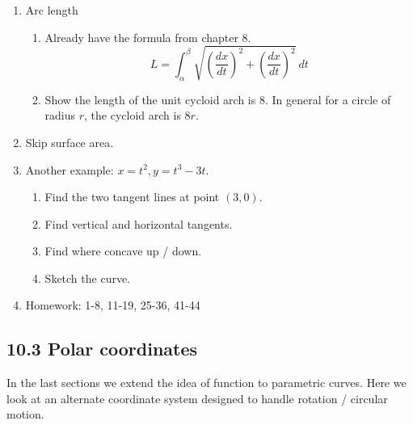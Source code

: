 \documentclass{article}
\begin{document}
\begin{enumerate}
\item Arc length
\begin{enumerate}
\item Already have the formula from chapter 8.
\[
L = \int_{\alpha}^{\beta} \sqrt{\left( \frac{dx}{dt}\right)^2 + \left( \frac{dx}{dt} \right)^2 }~dt
\]
\item Show the length of the unit cycloid arch is 8. In general for a circle of radius $r$, the cycloid arch is $8r$. 
\end{enumerate}


\item Skip surface area.

\item Another example: $x=t^2, y=t^3-3t$. 
\begin{enumerate}
\item Find the two tangent lines at point $(3,0)$. 
\item Find vertical and horizontal tangents.
\item Find where concave up / down.
\item Sketch the curve. 
\end{enumerate}


\item Homework: 1-8, 11-19, 25-36, 41-44

\end{enumerate}

\subsection{10.3 Polar coordinates}

In the last sections we extend the idea of function to parametric curves. Here we look at an alternate coordinate system designed to handle rotation / circular motion.
\end{document}
